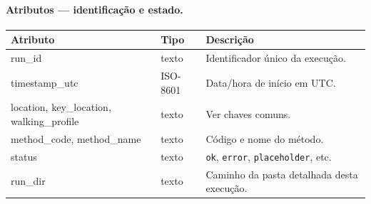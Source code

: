 \documentclass[11pt,a4paper]{article}
\begin{document}
\paragraph{Atributos --- identificação e estado.}
\begin{center}\small
\begin{tabular}{@{}>{\ttfamily}l l p{8.0cm}@{}}
\toprule
\normalfont Atributo & \normalfont Tipo & \normalfont Descrição \\
\midrule
run\_id        & texto      & Identificador único da execução. \\
timestamp\_utc & ISO-8601   & Data/hora de início em UTC. \\
location, key\_location, walking\_profile & texto & Ver chaves comuns. \\
method\_code, method\_name & texto & Código e nome do método. \\
status         & texto      & \texttt{ok}, \texttt{error}, \texttt{placeholder}, etc. \\
run\_dir       & texto      & Caminho da pasta detalhada desta execução. \\
\bottomrule
\end{tabular}
\end{center}
\end{document}
